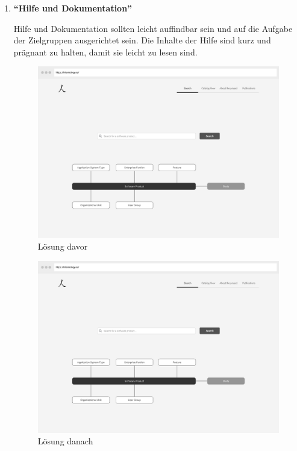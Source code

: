 \begin{enumerate}
\clearpage


\item \textbf{\enquote{Hilfe und Dokumentation}} \newline

Hilfe und Dokumentation sollten leicht auffindbar sein und auf die Aufgabe der Zielgruppen ausgerichtet sein. 
Die Inhalte der Hilfe sind kurz und prägnant zu halten, damit sie leicht zu lesen sind. 

\begin{figure}[H]
	\centering
    	\includegraphics[width=1.45\textwidth, angle=-90]{Images/Startseite}
   	\caption{Lösung davor}
   	\label{fig:wireframe_start}
\end{figure}

\clearpage

\begin{figure}[H]
	\centering
    	\includegraphics[width=1.45\textwidth, angle=-90]{Images/Startseite}
   	\caption{Lösung danach}
   	\label{fig:wireframe_start}
\end{figure}

\clearpage

\end{enumerate}
